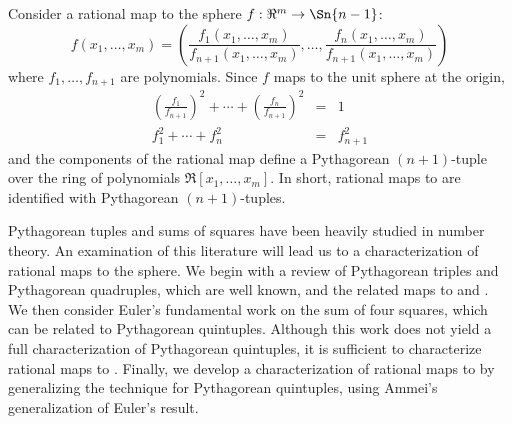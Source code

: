 \documentclass[11pt]{article}
\begin{document}
Consider a rational map to the sphere $f: \Re^m \rightarrow \Sn{n-1}$:
\[
	f(x_1,\ldots,x_m) =
	(\frac{f_1(x_1,\ldots,x_m)}{f_{n+1}(x_1,\ldots,x_m)}, \ldots,
	 \frac{f_n(x_1,\ldots,x_m)}{f_{n+1}(x_1,\ldots,x_m)})
\]
where $f_1,\ldots,f_{n+1}$ are polynomials.
Since $f$ maps to the unit sphere at the origin,
\begin{eqnarray}
       (\frac{f_1}{f_{n+1}})^2 + \cdots + (\frac{f_n}{f_{n+1}})^2 & = & 1 \\
	f_1^2 + \cdots + f_n^2 & = & f_{n+1}^2
\end{eqnarray}
and the components of the rational map define a Pythagorean $(n+1)$-tuple
over the ring of polynomials $\Re[x_1,\ldots,x_m]$.
In short, rational maps to  are identified with Pythagorean $(n+1)$-tuples.





Pythagorean tuples and sums of squares have been heavily studied in number theory.
An examination of this literature will lead us to a characterization of rational maps
to the sphere.
We begin with a review of Pythagorean triples and Pythagorean quadruples,
which are well known, and the related maps to  and .
We then consider Euler's fundamental work on the sum of four squares,
which can be related to Pythagorean quintuples.
Although this work does not yield a full characterization of Pythagorean quintuples,
it is sufficient to characterize rational maps to .
Finally, we develop a characterization of rational maps to 
by generalizing the technique for Pythagorean quintuples, 
using Ammei's generalization of Euler's result.
\end{document}
